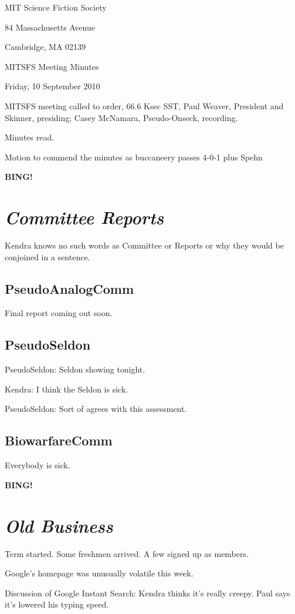 \documentclass[10pt]{article}
\newcommand{\bing}{{\bf BING!} }
\newcommand{\goto}[1]{\bing \vskip 12pt \section*{{\em{#1}}}}
\newcommand{\ps}{ plus Spehn\xspace}
\newcommand{\skinner}{Paul Weaver, President and Skinner}
\newcommand{\onseck}{Casey McNamara, Pseudo-Onseck}
\newcommand{\meetingdate}{Friday, 10 September 2010}
\begin{document}
\begin{center}

MIT Science Fiction Society

84 Massachusetts Avenue

Cambridge, MA 02139

\vspace{12pt}

MITSFS Meeting Minutes

\meetingdate

\end{center}

\vspace{18pt}

\setlength{\parskip}{6pt}

\noindent
MITSFS meeting called to order, 66.6 Ksec SST,
\skinner, presiding; \onseck, recording.

Minutes read.

Motion to commend the minutes as buccaneery passes 4-0-1 \ps

\goto{Committee Reports}

Kendra knows no such words as Committee or Reports or why they would be conjoined in a sentence.

\subsection*{PseudoAnalogComm} 

Final report coming out soon.

\subsection*{PseudoSeldon}

PseudoSeldon: Seldon showing tonight.

Kendra: I think the Seldon is sick.

PseudoSeldon: Sort of agrees with this assessment.

\subsection*{BiowarfareComm} 

Everybody is sick.

\goto{Old Business}

Term started. Some freshmen arrived.  A few signed up as members.

Google's homepage was unusually volatile this week.

Discussion of Google Instant Search: Kendra thinks it's really creepy.  Paul says it's lowered his typing speed.
\end{document}
